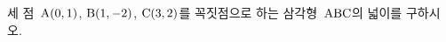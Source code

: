 세 점~$\mathrm{A}(0{,}\mkern3mu\mathopen{}1)$, $\mathrm{B}(1{,}\mkern3mu\mathopen{}-2)$, $\mathrm{C}(3{,}\mkern3mu\mathopen{}2)$를 꼭짓점으로 하는 삼각형~$\mathrm{ABC}$의 넓이를 구하시오.
